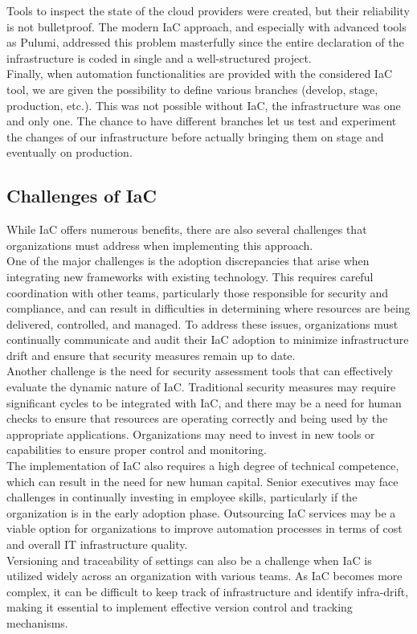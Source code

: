 Tools to inspect the state of the cloud providers were created, but their reliability is not bulletproof.
The modern IaC approach, and especially with advanced tools as Pulumi, addressed this problem masterfully since the entire declaration of the infrastructure is coded in single and a well-structured project.\\
Finally, when automation functionalities are provided with the considered IaC tool, we are given the possibility to define various branches (develop, stage, production, etc.).
This was not possible without IaC, the infrastructure was one and only one.
The chance to have different branches let us test and experiment the changes of our infrastructure before actually bringing them on stage and eventually on production.\\



\subsection{Challenges of IaC}

While IaC offers numerous benefits, there are also several challenges that organizations must address when implementing this approach.\\
One of the major challenges is the adoption discrepancies that arise when integrating new frameworks with existing technology. This requires careful coordination with other teams, particularly those responsible for security and compliance, and can result in difficulties in determining where resources are being delivered, controlled, and managed. To address these issues, organizations must continually communicate and audit their IaC adoption to minimize infrastructure drift and ensure that security measures remain up to date.\\
Another challenge is the need for security assessment tools that can effectively evaluate the dynamic nature of IaC. Traditional security measures may require significant cycles to be integrated with IaC, and there may be a need for human checks to ensure that resources are operating correctly and being used by the appropriate applications. Organizations may need to invest in new tools or capabilities to ensure proper control and monitoring.\\
The implementation of IaC also requires a high degree of technical competence, which can result in the need for new human capital. Senior executives may face challenges in continually investing in employee skills, particularly if the organization is in the early adoption phase. Outsourcing IaC services may be a viable option for organizations to improve automation processes in terms of cost and overall IT infrastructure quality.\\
Versioning and traceability of settings can also be a challenge when IaC is utilized widely across an organization with various teams. As IaC becomes more complex, it can be difficult to keep track of infrastructure and identify infra-drift, making it essential to implement effective version control and tracking mechanisms.


